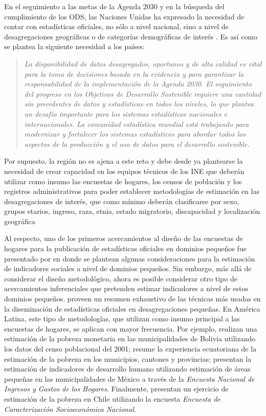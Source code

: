 \documentclass[
  12pt,
]{book}
\begin{document}
En el seguimiento a las metas de la Agenda 2030 y en la búsqueda del cumplimiento de los ODS, las Naciones Unidas ha expresado la necesidad de contar con estadísticas oficiales, no sólo a nivel nacional, sino a nivel de desagregaciones geográficas o de categorías demográficas de interés \citep{United_Nations_2017}. Es así como se plantea la siguiente necesidad a los países:

\begin{quote}
\emph{La disponibilidad de datos desagregados, oportunos y de alta calidad es vital para la toma de decisiones basada en la evidencia y para garantizar la responsabilidad de la implementación de la Agenda 2030. El seguimiento del progreso en los Objetivos de Desarrollo Sostenible requiere una cantidad sin precedentes de datos y estadísticas en todos los niveles, lo que plantea un desafío importante para los sistemas estadísticos nacionales e internacionales. La comunidad estadística mundial está trabajando para modernizar y fortalecer los sistemas estadísticos para abordar todos los aspectos de la producción y el uso de datos para el desarrollo sostenible.}
\end{quote}

Por supuesto, la región no es ajena a este reto y debe desde ya plantearse la necesidad de crear capacidad en los equipos técnicos de los INE que deberán utilizar como insumo las encuestas de hogares, los censos de población y los registros administrativos para poder establecer metodologías de estimación en las desagregaciones de interés, que como mínimo deberán clasificarse por sexo, grupos etarios, ingreso, raza, etnia, estado migratorio, discapacidad y localización geográfica \citep{United_Nations_2016}

Al respecto, uno de los primeros acercamientos al diseño de las encuestas de hogares para la publicación de estadísticas oficiales en dominios pequeños fue presentado por \citet{Sinngh_Gambino_Mantel_1994} en donde se plantean algunas consideraciones para la estimación de indicadores sociales a nivel de dominios pequeños. Sin embargo, más allá de considerar el diseño metodológico, ahora es posible considerar otro tipo de acercamientos inferenciales que pretenden estimar indicadores a nivel de estos dominios pequeños. \citet{Rao_Molina_2014} proveen un resumen exhaustivo de las técnicas más usadas en la diseminación de estadísticas oficiales en desagregaciones pequeñas. En América Latina, este tipo de metodologías, que utilizan como insumo principal a las encuestas de hogares, se aplican con mayor frecuencia. Por ejemplo, \citet{arias2007geography} realizan una estimación de la pobreza monetaria en las municipalidades de Bolivia utilizando los datos del censo poblacional del 2001; \citet{araujo20071990} resume la experiencia ecuatoriana de la estimación de la pobreza en los municipios, cantones y provincias; \citet{lopez2007poverty} presentan la estimación de indicadores de desarrollo humano utilizando estimación de áreas pequeñas en las municipalidades de México a través de la \emph{Encuesta Nacional de Ingresos y Gastos de los Hogares}. Finalmente, \citet{Casas_Cordero_Valencia_Encina_Lahiri_2016} presentan un ejercicio de estimación de la pobreza en Chile utilizando la encuesta \emph{Encuesta de Caracterización Socioeconómica Nacional}.
\end{document}
